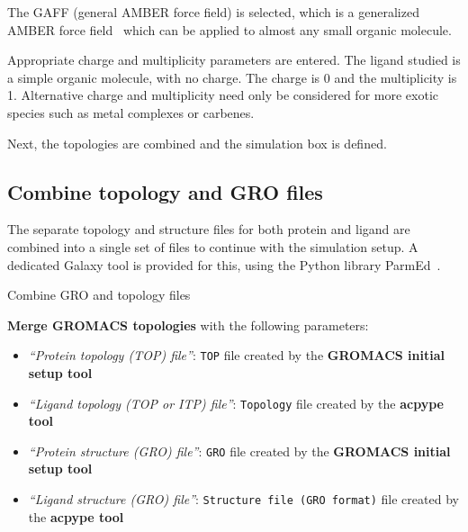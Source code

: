 \documentclass[twocolumn]{bmcart}%
\providecommand{\tightlist}{%
  \setlength{\itemsep}{0pt}\setlength{\parskip}{0pt}}
\begin{document}
The GAFF (general AMBER force field) is selected, which is a generalized AMBER force field~\cite{Wang2004} which can be applied to almost any small organic molecule.

Appropriate charge and multiplicity parameters are entered. The ligand studied is a simple organic molecule, with no charge. The charge is 0 and the multiplicity is 1. Alternative charge and multiplicity need only be considered for more exotic species such as metal complexes or carbenes.


Next, the topologies are combined and the simulation box is defined. 

\subsection*{Combine topology and GRO
files}\label{combine-topology-and-gro-files}

The separate topology and structure files for both protein and ligand are combined into a single set of files to continue with the simulation setup. A dedicated Galaxy tool is provided for this, using the Python library ParmEd~\cite{Swails2016}.

\begin{handson_box_colour}{Combine GRO and topology files}

  \textbf{Merge GROMACS topologies} with the following
  parameters:

  \begin{itemize}
  \tightlist
  \item
    \emph{``Protein topology (TOP) file''}: \texttt{TOP} file created by the \textbf{GROMACS initial setup tool}
  \item
    \emph{``Ligand topology (TOP or ITP) file''}: \texttt{Topology} file created by the \textbf{acpype tool}
  \item
    \emph{``Protein structure (GRO) file''}: \texttt{GRO} file created by the \textbf{GROMACS initial setup tool}
  \item
    \emph{``Ligand structure (GRO) file''}: \texttt{Structure file (GRO format)} file created by the \textbf{acpype tool}

  \end{itemize}

\end{handson_box_colour}
\end{document}
